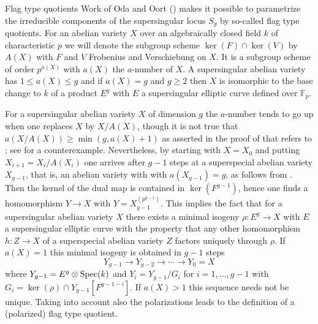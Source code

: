 \documentclass[11pt]{amsart}
\numberwithin{equation}{section}
\newcommand{\FF}{\mathbb F}
\theoremstyle{definition}
\theoremstyle{remark}
\begin{document}
\begin{section}{Flag type quotients}\label{FTQ}
Work of Oda and Oort (\cite{Oda-Oort}) 
makes it possible to parametrize the irreducible 
components of the supersingular locus $S_g$ by so-called flag type 
quotients. For an abelian variety $X$ over an algebraically closed field $k$ of
characteristic $p$ we will denote the 
subgroup scheme $\ker(F)\cap \ker(V)$
by $A(X)$ with $F$ and $V$ Frobenius and Verschiebung on $X$. 
It is a subgroup scheme of order $p^{a(X)}$ with $a(X)$ the
$a$-number of $X$. A supersingular abelian variety has $1 \leq a(X) \leq g$
and if $a(X)=g$ and $g\geq 2$ then $X$ is isomorphic to the base change to $k$
of a product $E^g$ with $E$ a supersingular elliptic curve defined over
${\FF}_p$. 

For a supersingular abelian variety $X$ of dimension $g$
the $a$-number tends to go up when one replaces $X$ by $X/A(X)$, though
it is not true that $a(X/A(X))\geq \min(g,a(X)+1)$ as asserted in the proof of \cite[1.8 Lemma]{L-O} 
that refers to \cite{K-Z-L};
see \cite[Remark 3.17]{KYY} for a counterexample. 
Nevertheless, by starting with $X=X_0$ 
and putting $X_{i+1}=X_i/A(X_i)$ one arrives after  $g-1$
steps at a superspecial abelian variety $X_{g-1}$, that is, 
an abelian variety with 
with $a(X_{g-1})=g$, as follows from \cite[Lemma 9]{Zink}. Then the kernel of the dual map is 
contained in $\ker(F^{g-1})$, hence one finds a homomorphism $Y\to X$
with $Y=X_{g-1}^{(p^{g-1})}$. 
 This implies the fact that for
a supersingular abelian variety $X$ there exists a minimal isogeny
$\rho: E^g \to X$ with $E$ a supersingular elliptic curve with the
property that any other homomorphism $h: Z \to X$ of a superspecial 
abelian variety $Z$ factors uniquely through $\rho$. If $a(X)=1$ 
this minimal isogeny is obtained in $g-1$ steps
$$
Y_{g-1} \to Y_{g-2} \to \cdots \to Y_0=X
$$
where $Y_{g-1}=E^g\otimes {\rm Spec}(k)$ and $Y_i=Y_{g-1}/G_i$ for
$i=1,\ldots,g-1$ with $G_i=\ker(\rho)\cap Y_{g-1}[F^{g-1-i}]$.
If $a(X)>1$ this sequence needs not be unique. Taking into account also
the polarizations leads to the definition of a (polarized) flag type quotient. 


\end{section}
\end{document}
